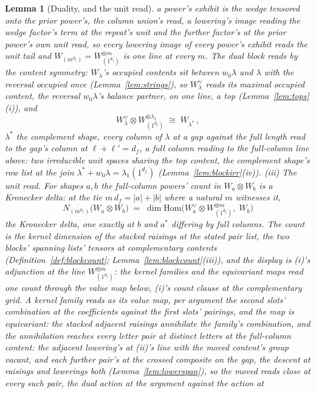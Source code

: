 \documentclass[11pt]{article}
\newtheorem{lemma}{Lemma}
\theoremstyle{definition}
\begin{document}
\begin{lemma}[Duality, and the unit read]
a power's exhibit is the wedge tensored onto the prior power's,
the column union's read, a lowering's image reading the wedge
factor's term at the repeat's unit and the further factor's at
the prior power's own unit read, so every lowering image of every
power's exhibit reads the unit tail and
$W_{(m^{d_f})}=W_{(1^{d_f})}^{\otimes m}$ is one line at every
$m$. The dual block reads by
the content symmetry: $W_\lambda$'s occupied contents sit between
$w_0\lambda$ and $\lambda$ with the reversal occupied once
(Lemma~\ref{lem:strings}), so $W_\lambda^\vee$ reads its maximal
occupied content, the reversal $w_0\lambda$'s balance partner, on one
line, a top
(Lemma~\ref{lem:tops}(i)), and
\[
W_\lambda^\vee\otimes W_{(1^{d_f})}^{\otimes\lambda_1}\;\cong\;W_{\lambda^*}\,,
\]
$\lambda^*$ the \emph{complement shape}, every column of $\lambda$
at a gap against the full length read to the gap's column at
$\ell+\ell'=d_f$, a full column reading to the
full-column line above: two irreducible unit spaces sharing the top
content, the complement shape's row list at the join
$\lambda^*+w_0\lambda=\lambda_1(1^{d_f})$
(Lemma~\ref{lem:blockirr}(iv)).
\emph{(iii) The unit read.} For shapes $a,b$ the full-column
powers' count in $W_a\otimes W_b$ is a Kronecker delta: at the tie
$m\,d_f=|a|+|b|$ where a natural $m$ witnesses it,
\[
N_{(m^{d_f})}\big(W_a\otimes W_b\big)
\;=\;\dim\mathrm{Hom}\big(W_a^\vee\otimes W_{(1^{d_f})}^{\otimes m},\;
W_b\big)
\]
the Kronecker delta, one exactly at $b$ and $a^*$ differing by full
columns. The count is the kernel dimension of the stacked raisings
at the stated pair list, the two blocks' spanning lists' tensors at
complementary contents (Definition~\ref{def:blockcount};
Lemma~\ref{lem:blockcount}(iii)), and the display is (i)'s
adjunction at the line $W_{(1^{d_f})}^{\otimes m}$: the kernel
families and the equivariant maps read one count through the value
map below, (i)'s count clause at the complementary grid. A kernel
family reads as its \emph{value map}, per argument the second
slots' combination at the coefficients against the first slots'
pairings, and the map is equivariant: the stacked adjacent raisings
annihilate the family's combination, and the annihilation reaches
every letter pair at distinct letters at the full-column content:
the adjacent lowering's at (ii)'s line with the moved content's
group vacant, and each further pair's at the crossed composite on
the gap, the descent at raisings and lowerings both
(Lemma~\ref{lem:lowerspan}), so the moved reads close at every
such pair, the dual action at the argument against the action at

\end{lemma}
\end{document}
